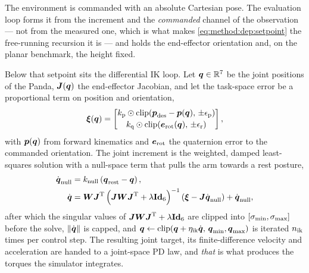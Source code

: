 The environment is commanded with an absolute Cartesian pose. The evaluation loop forms it from the
increment and the \emph{commanded} channel of the observation --- not from the measured one, which
is what makes \eqref{eq:method:dep:setpoint} the free-running recursion it is --- and holds the
end-effector orientation and, on the planar benchmark, the height fixed.

Below that setpoint sits the differential \ac{IK} loop. Let $\boldsymbol{q}\in\mathbb{R}^{7}$ be the joint
positions of the Panda, $\boldsymbol{J}(\boldsymbol{q})$ the end-effector Jacobian, and let the task-space error be a
proportional term on position and orientation,
\begin{equation}\label{eq:method:dep:taskerr}
  \boldsymbol{\xi}(\boldsymbol{q})
  = \begin{bmatrix}
      k_{\textrm{p}}\odot\operatorname{clip}\!\left(\boldsymbol{p}_{\textrm{des}}-\boldsymbol{p}(\boldsymbol{q}),\,\pm\epsilon_{\textrm{p}}\right)\\[2pt]
      k_{\textrm{q}}\odot\operatorname{clip}\!\left(\boldsymbol{e}_{\textrm{rot}}(\boldsymbol{q}),\,\pm\epsilon_{\textrm{r}}\right)
    \end{bmatrix},
\end{equation}
with $\boldsymbol{p}(\boldsymbol{q})$ from forward kinematics and $\boldsymbol{e}_{\textrm{rot}}$ the quaternion error to the
commanded orientation. The joint increment is the weighted, damped least-squares solution with a
null-space term that pulls the arm towards a rest posture,
\begin{align}
  \dot{\boldsymbol{q}}_{\textrm{null}} &= k_{\textrm{null}}\left(\boldsymbol{q}_{\textrm{rest}}-\boldsymbol{q}\right),
    \label{eq:method:dep:null}\\
  \dot{\boldsymbol{q}}
    &= \boldsymbol{W}\boldsymbol{J}^{\textrm{T}}
       \left(\boldsymbol{J}\boldsymbol{W}\boldsymbol{J}^{\textrm{T}} + \lambda\textbf{Id}_{6}\right)^{-1}
       \left(\boldsymbol{\xi} - \boldsymbol{J}\dot{\boldsymbol{q}}_{\textrm{null}}\right)
     + \dot{\boldsymbol{q}}_{\textrm{null}},
    \label{eq:method:dep:dls}
\end{align}
after which the singular values of $\boldsymbol{J}\boldsymbol{W}\boldsymbol{J}^{\textrm{T}} + \lambda\textbf{Id}_{6}$ are clipped into
$[\sigma_{\textrm{min}},\sigma_{\textrm{max}}]$ before the solve, $\|\dot{\boldsymbol{q}}\|$ is capped, and
$\boldsymbol{q} \leftarrow \operatorname{clip}(\boldsymbol{q}+\eta_{\textrm{ik}}\dot{\boldsymbol{q}},\,\boldsymbol{q}_{\textrm{min}},\boldsymbol{q}_{\textrm{max}})$
is iterated $n_{\textrm{ik}}$ times per control step. The resulting joint target, its finite-difference
velocity and acceleration are handed to a joint-space PD law, and \emph{that} is what produces the
torques the simulator integrates.

